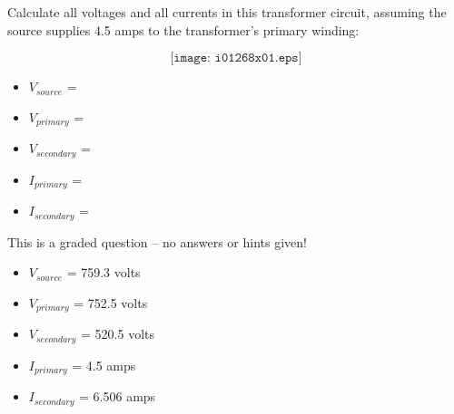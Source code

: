 

Calculate all voltages and all currents in this transformer circuit, assuming the source supplies 4.5 amps to the transformer's primary winding:

$$\texttt{[image: i01268x01.eps]}$$

\begin{itemize}
\item{} $V_{source}$ = 
\item{} $V_{primary}$ = 
\item{} $V_{secondary}$ = 
\item{} $I_{primary}$ = 
\item{} $I_{secondary}$ = 
\end{itemize}

\vfil 

\eject






This is a graded question -- no answers or hints given!







\begin{itemize}
\item{} $V_{source}$ = 759.3 volts
\item{} $V_{primary}$ = 752.5 volts
\item{} $V_{secondary}$ = 520.5 volts
\item{} $I_{primary}$ = 4.5 amps
\item{} $I_{secondary}$ = 6.506 amps
\end{itemize}




